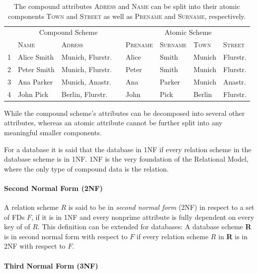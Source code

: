 \begin{table}[ht]
    \centering
    \begin{tabular}{rlllllll}\toprule
    & \multicolumn{3}{c}{Compound Scheme} & & \multicolumn{2}{c}{Atomic Scheme} \\
    \cmidrule{2-3} \cmidrule{5-8}
    & \textsc{Name} & \textsc{Adress} && \textsc{Prename} & \textsc{Surname} & \textsc{Town} & \textsc{Street}   \\ \midrule
1 & Alice Smith & Munich, Flurstr. && Alice & Smith & Munich & Flurstr. \\
2 & Peter Smith & Munich, Flurstr. && Peter & Smith & Munich & Flurstr. \\
3 & Ana Parker & Munich, Anastr. && Ana & Parker & Munich & Anastr. \\
4 & John Pick & Berlin, Flurstr. && John & Pick & Berlin & Flurstr. \\
\bottomrule
\end{tabular}
\caption{The compound attributes \textsc{Adress} and \textsc{Name} can be split into their atomic components \textsc{Town} and \textsc{Street} as well as \textsc{Prename} and \textsc{Surname}, respectively.}\label{tab:first-normal-form}
\end{table}
While the compound scheme's attributes can be decomposed into several other attributes, whereas an atomic attribute cannot be further split into any meaningful smaller components.

For a database it is said that the database in 1NF if every relation scheme in the database scheme is in 1NF.
1NF is the very foundation of the Relational Model, where the only type of compound data is the relation.\cite[p.~6]{COD90}

\paragraph{Second Normal Form (2NF)}
A relation scheme \(R\) is said to be in \emph{second normal form} (2NF) in respect to a set of FDs \(F\), if it is in 1NF and every nonprime attribute is fully dependent on every key of of \(R\).\cite[p.~99]{MAI83} This definition can be extended for databases: A database scheme \textbf{R} is in second normal form with respect to \(F\) if every relation scheme \(R\) in \textbf{R} is in 2NF with respect to \(F\).

\paragraph{Third Normal Form (3NF)}

